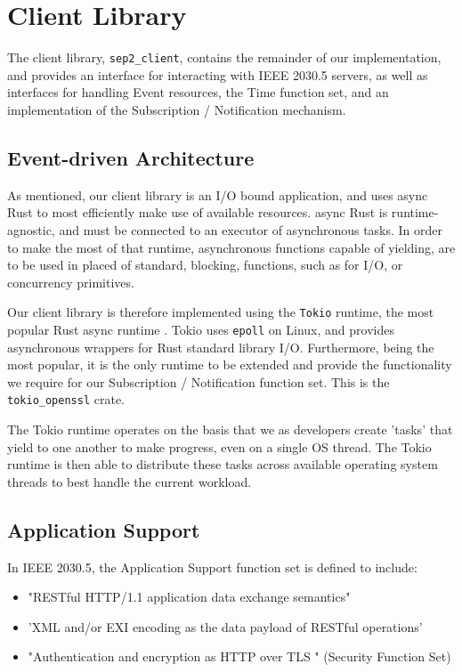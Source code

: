 \section{Client Library}
The client library, \texttt{sep2\_client}, contains the remainder of our implementation, and provides an interface for interacting with IEEE 2030.5 servers, as well as interfaces for handling Event resources, the Time function set, and an implementation of the Subscription / Notification mechanism. 

\subsection{Event-driven Architecture}
As mentioned, our client library is an I/O bound application, and uses async Rust to most efficiently make use of available resources. async Rust is runtime-agnostic, and must be connected to an executor of asynchronous tasks. In order to make the most of that runtime, asynchronous functions capable of yielding, are to be used in placed of standard, blocking, functions, such as for I/O, or concurrency primitives.

Our client library is therefore implemented using the \texttt{Tokio} runtime, the most popular Rust async runtime \cite{Tokio}. Tokio uses \texttt{epoll} on Linux, and provides asynchronous wrappers for Rust standard library I/O. Furthermore, being the most popular, it is the only runtime to be extended and provide the functionality we require for our Subscription / Notification function set. This is the \texttt{tokio\_openssl} crate.

The Tokio runtime operates on the basis that we as developers create 'tasks' that yield to one another to make progress, even on a single OS thread. The Tokio runtime is then able to distribute these tasks across available operating system threads to best handle the current workload.

\subsection{Application Support}
In IEEE 2030.5, the Application Support function set is defined to include: \cite{2030}

\begin{itemize}
    \item "RESTful HTTP/1.1 application data exchange semantics"
    \item 'XML and/or EXI encoding as the data payload of RESTful operations'
    \item "Authentication and encryption as HTTP over TLS " (Security Function Set)
\end{itemize}

